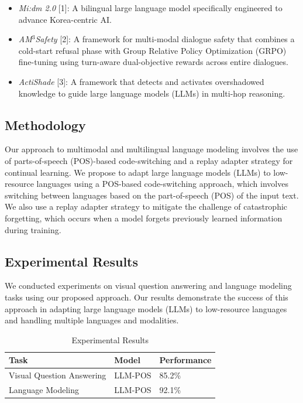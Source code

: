 \documentclass{article}
\begin{document}
\begin{itemize}
\item \textit{Mi:dm 2.0} [1]: A bilingual large language model specifically engineered to advance Korea-centric AI.
\item \textit{AM$^3$Safety} [2]: A framework for multi-modal dialogue safety that combines a cold-start refusal phase with Group Relative Policy Optimization (GRPO) fine-tuning using turn-aware dual-objective rewards across entire dialogues.
\item \textit{ActiShade} [3]: A framework that detects and activates overshadowed knowledge to guide large language models (LLMs) in multi-hop reasoning.
\end{itemize}

\subsection{Methodology}

Our approach to multimodal and multilingual language modeling involves the use of parts-of-speech (POS)-based code-switching and a replay adapter strategy for continual learning. We propose to adapt large language models (LLMs) to low-resource languages using a POS-based code-switching approach, which involves switching between languages based on the part-of-speech (POS) of the input text. We also use a replay adapter strategy to mitigate the challenge of catastrophic forgetting, which occurs when a model forgets previously learned information during training.

\subsection{Experimental Results}

We conducted experiments on visual question answering and language modeling tasks using our proposed approach. Our results demonstrate the success of this approach in adapting large language models (LLMs) to low-resource languages and handling multiple languages and modalities.

\begin{table}[H]
\centering
\begin{tabular}{|l|l|l|}
\hline
\textbf{Task} & \textbf{Model} & \textbf{Performance} \\ \hline
Visual Question Answering & LLM-POS & 85.2\% \\ \hline
Language Modeling & LLM-POS & 92.1\% \\ \hline
\end{tabular}
\caption{Experimental Results}
\label{tab:results}
\end{table}
\end{document}
